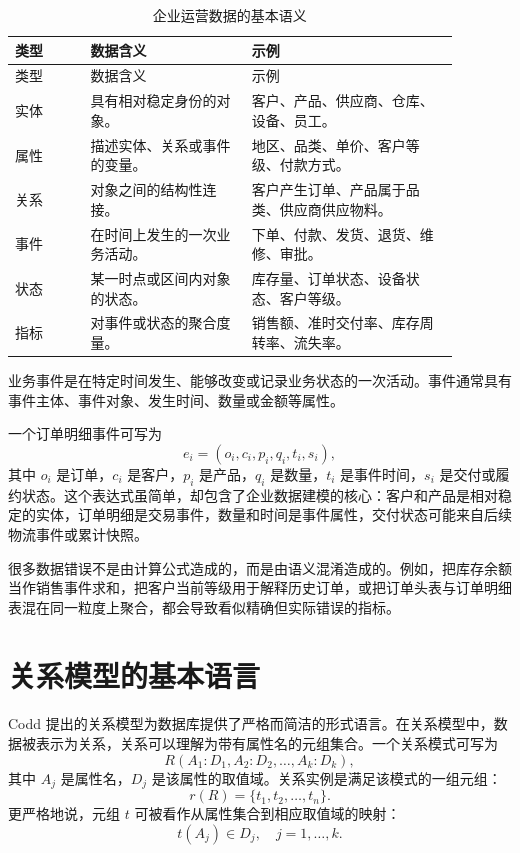 \documentclass[UTF8,fontset=fandol,openany,zihao=-4]{ctexbook}
\begin{document}
\begin{longtable}{p{0.15\linewidth}p{0.32\linewidth}p{0.41\linewidth}}
\caption{企业运营数据的基本语义}\\
\toprule
类型 & 数据含义 & 示例\\
\midrule
\endfirsthead
\toprule
类型 & 数据含义 & 示例\\
\midrule
\endhead
实体 & 具有相对稳定身份的对象。 & 客户、产品、供应商、仓库、设备、员工。\\
属性 & 描述实体、关系或事件的变量。 & 地区、品类、单价、客户等级、付款方式。\\
关系 & 对象之间的结构性连接。 & 客户产生订单、产品属于品类、供应商供应物料。\\
事件 & 在时间上发生的一次业务活动。 & 下单、付款、发货、退货、维修、审批。\\
状态 & 某一时点或区间内对象的状态。 & 库存量、订单状态、设备状态、客户等级。\\
指标 & 对事件或状态的聚合度量。 & 销售额、准时交付率、库存周转率、流失率。\\
\bottomrule
\end{longtable}

\begin{definition}[业务事件]
业务事件是在特定时间发生、能够改变或记录业务状态的一次活动。事件通常具有事件主体、事件对象、发生时间、数量或金额等属性。
\end{definition}

一个订单明细事件可写为
\[
e_i=(o_i,c_i,p_i,q_i,t_i,s_i),
\]
其中 \(o_i\) 是订单，\(c_i\) 是客户，\(p_i\) 是产品，\(q_i\) 是数量，\(t_i\) 是事件时间，\(s_i\) 是交付或履约状态。这个表达式虽简单，却包含了企业数据建模的核心：客户和产品是相对稳定的实体，订单明细是交易事件，数量和时间是事件属性，交付状态可能来自后续物流事件或累计快照。

\begin{remark}
很多数据错误不是由计算公式造成的，而是由语义混淆造成的。例如，把库存余额当作销售事件求和，把客户当前等级用于解释历史订单，或把订单头表与订单明细表混在同一粒度上聚合，都会导致看似精确但实际错误的指标。
\end{remark}

\section{关系模型的基本语言}

Codd 提出的关系模型为数据库提供了严格而简洁的形式语言。在关系模型中，数据被表示为关系，关系可以理解为带有属性名的元组集合。一个关系模式可写为
\[
R(A_1:D_1,A_2:D_2,\ldots,A_k:D_k),
\]
其中 \(A_j\) 是属性名，\(D_j\) 是该属性的取值域。关系实例是满足该模式的一组元组：
\[
r(R)=\{t_1,t_2,\ldots,t_n\}.
\]
更严格地说，元组 \(t\) 可被看作从属性集合到相应取值域的映射：
\[
t(A_j)\in D_j,\quad j=1,\ldots,k.
\]
\end{document}
